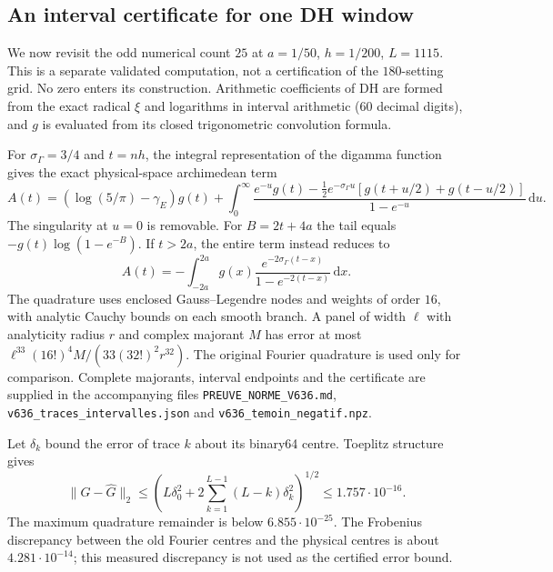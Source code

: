 \documentclass[11pt]{amsart}
\theoremstyle{remark}
\theoremstyle{definition}
\begin{document}
\subsection*{An interval certificate for one DH window}\label{sec:certificate}
We now revisit the odd numerical count $25$ at $a=1/50$, $h=1/200$, $L=1115$. This is a separate validated computation, not a certification of the $180$-setting grid. No zero enters its construction. Arithmetic coefficients of DH are formed from the exact radical $\xi$ and logarithms in interval arithmetic (60 decimal digits), and $g$ is evaluated from its closed trigonometric convolution formula.

For $\sigma_\Gamma=3/4$ and $t=nh$, the integral representation of the digamma function \cite[5.9.16]{DLMF} gives the exact physical-space archimedean term
\[
A(t)=(\log(5/\pi)-\gamma_E)g(t)+
\int_0^\infty\frac{e^{-u}g(t)-\frac12e^{-\sigma_\Gamma u}
[g(t+u/2)+g(t-u/2)]}{1-e^{-u}}\,\mathrm du.
\]
The singularity at $u=0$ is removable. For $B=2t+4a$ the tail equals $-g(t)\log(1-e^{-B})$. If $t>2a$, the entire term instead reduces to
\[
A(t)=-\int_{-2a}^{2a}g(x)
\frac{e^{-2\sigma_\Gamma(t-x)}}{1-e^{-2(t-x)}}\,\mathrm dx.
\]
The quadrature uses enclosed Gauss--Legendre nodes and weights of order $16$, with analytic Cauchy bounds on each smooth branch. A panel of width $\ell$ with analyticity radius $r$ and complex majorant $M$ has error at most $\ell^{33}(16!)^4M/(33(32!)^2r^{32})$. The original Fourier quadrature is used only for comparison. Complete majorants, interval endpoints and the certificate are supplied in the accompanying files \texttt{PREUVE\_NORME\_V636.md}, \texttt{v636\_traces\_intervalles.json} and \texttt{v636\_temoin\_negatif.npz}.

Let $\delta_k$ bound the error of trace $k$ about its binary64 centre. Toeplitz structure gives
\[
\|G-\widehat G\|_2\le
\left(L\delta_0^2+2\sum_{k=1}^{L-1}(L-k)\delta_k^2\right)^{1/2}
\le1.757\cdot10^{-16}.
\]
The maximum quadrature remainder is below $6.855\cdot10^{-25}$. The Frobenius discrepancy between the old Fourier centres and the physical centres is about $4.281\cdot10^{-14}$; this measured discrepancy is not used as the certified error bound.
\end{document}
